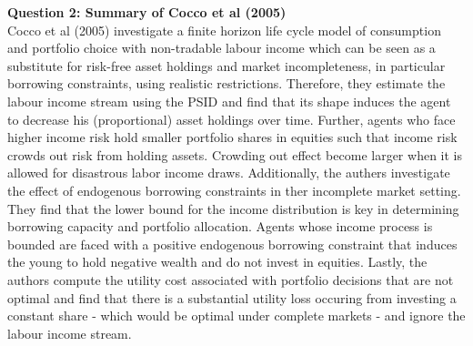 \documentclass[a4paper,12pt, parskip=half-]{scrartcl}
\begin{document}
\textbf{Question 2: Summary of Cocco et al (2005)}\\

Cocco et al (2005) investigate a finite horizon life cycle model of consumption and portfolio choice with non-tradable labour income which can be seen as a substitute for risk-free asset holdings and market incompleteness, in particular borrowing constraints, using realistic restrictions. Therefore, they estimate the labour income stream using the PSID and find that its shape induces the agent to decrease his (proportional) asset holdings over time. Further, agents who face higher income risk hold smaller portfolio shares in equities such that income risk crowds out risk from holding assets. Crowding out effect become larger when it is allowed for disastrous labor income draws. Additionally, the authers investigate the effect of endogenous borrowing constraints in ther incomplete market setting. They find that the lower bound
for the income distribution is key in determining borrowing capacity and portfolio allocation. Agents whose income process is bounded are faced with a positive endogenous borrowing constraint that induces the young to hold negative wealth and do not invest in equities. Lastly, the authors compute the utility cost associated with portfolio decisions that are not optimal and find that there is a substantial utility loss occuring from investing a constant share - which would be optimal under complete markets - and ignore the labour income stream.
\end{document}
